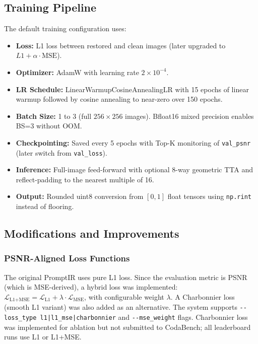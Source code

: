 \documentclass[12pt, a4paper]{article}
\begin{document}
\subsection{Training Pipeline}
The default training configuration uses:
\begin{itemize}
    \item \textbf{Loss:} L1 loss between restored and clean images (later upgraded to $L1 + \alpha\cdot\text{MSE}$).
    \item \textbf{Optimizer:} AdamW with learning rate $2 \times 10^{-4}$.
    \item \textbf{LR Schedule:} LinearWarmupCosineAnnealingLR with 15 epochs of linear warmup followed by cosine annealing to near-zero over 150 epochs.
    \item \textbf{Batch Size:} 1 to 3 (full $256 \times 256$ images). Bfloat16 mixed precision enables BS=3 without OOM.
    \item \textbf{Checkpointing:} Saved every 5 epochs with Top-K monitoring of \texttt{val\_psnr} (later switch from \texttt{val\_loss}).
    \item \textbf{Inference:} Full-image feed-forward with optional 8-way geometric TTA and reflect-padding to the nearest multiple of 16.
    \item \textbf{Output:} Rounded uint8 conversion from $[0,1]$ float tensors using \texttt{np.rint} instead of flooring.
\end{itemize}

\subsection{Modifications and Improvements}

\subsubsection{PSNR-Aligned Loss Functions}
The original PromptIR uses pure L1 loss. Since the evaluation metric is PSNR (which is MSE-derived), a hybrid loss was implemented: $\mathcal{L}_{\text{L1+MSE}} = \mathcal{L}_{\text{L1}} + \lambda \cdot \mathcal{L}_{\text{MSE}}$, with configurable weight $\lambda$. A Charbonnier loss (smooth L1 variant) was also added as an alternative. The system supports \texttt{-{}-loss\_type l1|l1\_mse|charbonnier} and \texttt{-{}-mse\_weight} flags. Charbonnier loss was implemented for ablation but not submitted to CodaBench; all leaderboard runs use L1 or L1+MSE.
\end{document}
